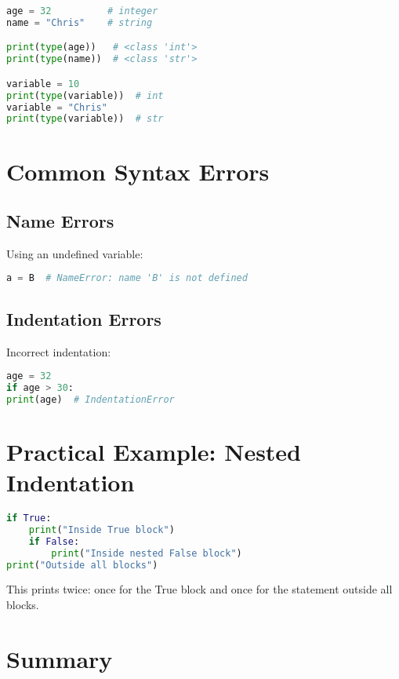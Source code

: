 \begin{lstlisting}[language=Python, caption={Type inference example}]
age = 32          # integer
name = "Chris"    # string

print(type(age))   # <class 'int'>
print(type(name))  # <class 'str'>

variable = 10
print(type(variable))  # int
variable = "Chris"
print(type(variable))  # str
\end{lstlisting}

\section{Common Syntax Errors}

\subsection{Name Errors}

Using an undefined variable:

\begin{lstlisting}[language=Python, caption={Name error example}]
a = B  # NameError: name 'B' is not defined
\end{lstlisting}

\subsection{Indentation Errors}

Incorrect indentation:

\begin{lstlisting}[language=Python, caption={Indentation error example}]
age = 32
if age > 30:
print(age)  # IndentationError
\end{lstlisting}

\section{Practical Example: Nested Indentation}

\begin{lstlisting}[language=Python, caption={Nested indentation example}]
if True:
    print("Inside True block")
    if False:
        print("Inside nested False block")
print("Outside all blocks")
\end{lstlisting}

This prints twice: once for the True block and once for the statement outside all blocks.

\section{Summary}

